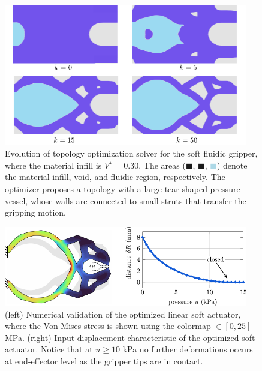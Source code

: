 \begin{figure}[!t]
  \centering
  \vspace{-3mm}
  \includegraphics*[width=0.95\textwidth]{./pdf/thesis-figure-3-7.pdf}
  \caption{Evolution of topology optimization solver for the soft fluidic gripper, where the material infill is $V^\star = 0.30$. The areas (\textcolor{matinfil}{$\blacksquare$}, \textcolor{lightvoid}{$\blacksquare$}, \textcolor{lightblue}{$\blacksquare$}) denote the material infill, void, and fluidic region, respectively. The optimizer proposes a topology with a large tear-shaped pressure vessel, whose walls are connected to small struts that transfer the gripping motion.}
  \label{fig:C3:topo_result_gripper}
  \vspace{-3mm}
\end{figure}

\begin{figure}[!t]
  \centering
  \vspace{-3mm}
  \includegraphics*[width=0.95\textwidth]{./pdf/thesis-figure-3-6.pdf}
  \caption{(left) Numerical validation of the optimized linear soft actuator, where the Von Mises stress is shown using the colormap \protect{}$\!\!\in [0,25]$ \si{\mega \pascal}. (right) Input-displacement characteristic of the optimized soft actuator. Notice that at $u \ge 10$ \si{\kilo \pascal} no further deformations occurs at end-effector level as the gripper tips are in contact.}
  \label{fig:C3:topo_result_gripper_fem}
\end{figure}


